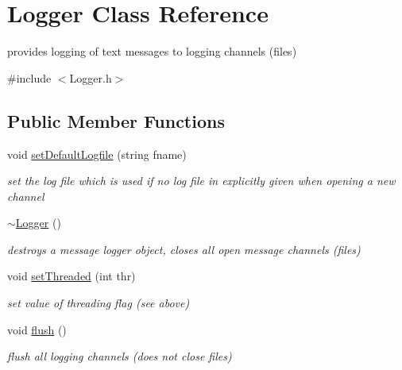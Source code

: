 \hypertarget{classLogger}{}\section{Logger Class Reference}
\label{classLogger}


provides logging of text messages to logging channels (files)  




{\ttfamily \#include $<$Logger.\+h$>$}

\subsection*{Public Member Functions}
\begin{DoxyCompactItemize}
\item 
\mbox{\label{classLogger_a5a9c615a5e76e3ddd46825aa6d70bb79}} 
void \hyperlink{classLogger_a5a9c615a5e76e3ddd46825aa6d70bb79}{set\+Default\+Logfile} (string fname)
\begin{DoxyCompactList}\small\item\em set the log file which is used if no log file in explicitly given when opening a new channel \end{DoxyCompactList}\item 
\mbox{\label{classLogger_acb668a9e186a25fbaad2e4af6d1ed00a}} 
\hyperlink{classLogger_acb668a9e186a25fbaad2e4af6d1ed00a}{$\sim$\+Logger} ()
\begin{DoxyCompactList}\small\item\em destroys a message logger object, closes all open message channels (files) \end{DoxyCompactList}\item 
\mbox{\label{classLogger_aa2e69cea8f4c129980f843c02e2279dd}} 
void \hyperlink{classLogger_aa2e69cea8f4c129980f843c02e2279dd}{set\+Threaded} (int thr)
\begin{DoxyCompactList}\small\item\em set value of threading flag (see above) \end{DoxyCompactList}\item 
\mbox{\label{classLogger_a5cc08473729523bb4bde48459f2ac468}} 
void \hyperlink{classLogger_a5cc08473729523bb4bde48459f2ac468}{flush} ()
\begin{DoxyCompactList}\small\item\em flush all logging channels (does not close files) \end{DoxyCompactList}\item 

\end{DoxyCompactItemize}
